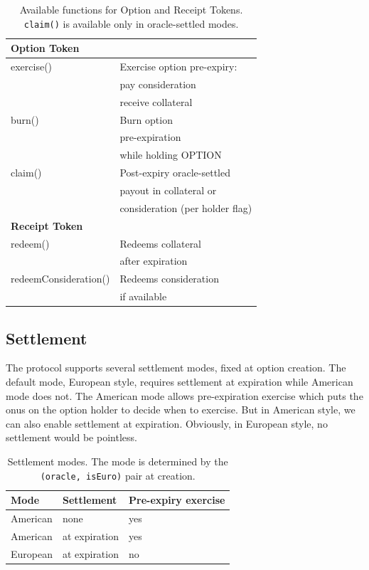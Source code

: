 \documentclass[%
 reprint,
 amsmath,amssymb,
 aps,
 prl,
floatfix,
]{revtex4-2}
\begin{document}
\begin{table}[ht]
\centering
\begin{tabular}{|p{3.5cm} p{4cm}|}
\hline
\textbf{Option Token} & \\
\hline
exercise() & Exercise option pre-expiry: \\ &  pay consideration \\ & receive collateral \\
\hline
burn() & Burn option \\ & pre-expiration \\ & while holding OPTION \\
\hline
claim() & Post-expiry oracle-settled \\ & payout in collateral or \\ & consideration (per holder flag) \\
\hline
\textbf{Receipt Token} &  \\
\hline
redeem() & Redeems collateral \\ & after expiration \\
\hline
redeemConsideration() & Redeems consideration \\ & if available \\
\hline
\end{tabular}
\caption{Available functions for Option and Receipt Tokens. \texttt{claim()} is available only in oracle-settled modes.}
\label{tab:functions}
\end{table}


\subsection{Settlement}

The protocol supports several settlement modes, fixed at option creation. 
The default mode, European style, requires settlement at expiration while American mode does not. 
The American mode allows pre-expiration exercise which puts the onus on the option holder to decide when to exercise.
But in American style, we can also enable settlement at expiration.
Obviously, in European style, no settlement would be pointless.

\begin{table}[ht]
\centering
\begin{tabular}{|p{1.8cm} p{2.0cm} p{3.2cm}|}
\hline
\textbf{Mode} & \textbf{Settlement} & \textbf{Pre-expiry exercise} \\
\hline
American & none & yes \\
\hline
American & at expiration & yes  \\
\hline
European & at expiration & no \\
\hline
\end{tabular}
\caption{Settlement modes. The mode is determined by the \texttt{(oracle, isEuro)} pair at creation.}
\label{tab:modes}
\end{table}
\end{document}

